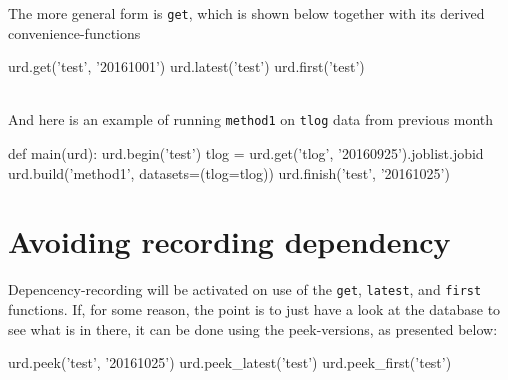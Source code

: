 The more general form is \texttt{get}, which is shown below together
with its derived convenience-functions
\\
\begin{python}
  urd.get('test', '20161001')
  urd.latest('test')
  urd.first('test')
\end{python}
\\
And here is an example of running \texttt{method1} on \texttt{tlog} data
from previous month
\\
\begin{python}
def main(urd):
  urd.begin('test')
  tlog = urd.get('tlog', '20160925').joblist.jobid
  urd.build('method1', datasets=(tlog=tlog))
  urd.finish('test', '20161025')
\end{python}



\section{Avoiding recording dependency}
Depencency-recording will be activated on use of the \texttt{get},
\texttt{latest}, and \texttt{first} functions.  If, for some reason,
the point is to just have a look at the database to see what is in
there, it can be done using the peek-versions, as presented below:
\\
\begin{python}
  urd.peek('test', '20161025')
  urd.peek_latest('test')
  urd.peek_first('test')
\end{python}



\newpage

